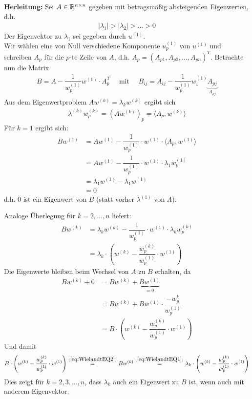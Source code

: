 \textbf{Herleitung:}
Sei $A\in\mathbb R^{n\times n}$ gegeben mit betragsmäßig absteigenden Eigenwerten, d.h. 
%
\begin{align*}
  |\lambda_1| > |\lambda_2| > \dots > 0
\end{align*}
%
Der Eigenvektor zu $\lambda_1$ sei gegeben durch $u^{(1)}$. \\
Wir wählen eine von Null verschiedene Komponente $u^{(1)}_p$ von $u^{(1)}$ und schreiben $A_p$ für die $p$-te Zeile
von $A$, d.h. $A_p=(A_{p1},A_{p2},\dots,A_{pn})^T$. Betrachte nun die Matrix 
%
\begin{align*}
  B 
  = A - \dfrac{1}{w_p^{(1)}} w^{(1)}\cdot A_p^T\quad\text{ mit }\quad B_{ij} = 
  A_{ij}-\dfrac{1}{w^{(1)}_p}w^{(1)}_i\underbrace{A_{pj}}_{A_{pj}}
\end{align*}
%
Aus dem Eigenwertproblem $Aw^{(k)} = \lambda_k w^{(k)}$ ergibt sich
%
\begin{align*}
  \lambda^{(k)}w^{(k)}_p = (Aw^{(k)})_p = \langle A_p, w^{(k)}\rangle
\end{align*}
%
Für $k=1$ ergibt sich:
%
\begin{align*}
  Bw^{(1)} 
  &= Aw^{(1)} - \dfrac{1}{w^{(1)}_p} \cdot w^{(1)}\cdot \langle A_p, w^{(1)}\rangle \\
  &= Aw^{(1)} - \dfrac{1}{w^{(1)}_p} \cdot w^{(1)}\cdot \lambda_1 w^{(1)}_p \\
  &= \lambda_1 w^{(1)} - \lambda_1w^{(1)} \\
  &= 0
\end{align*}
%
d.h. $0$ ist ein Eigenwert von $B$  (statt vorher $\lambda^{(1)}$ von $A$).  

Analoge Überlegung für $k=2,\dots,n$ liefert:
%
\begin{align*}
  Bw^{(k)} 
  &= \lambda_k w^{(k)} - \dfrac{1}{w^{(1)}_p} \cdot w^{(1)}\cdot \lambda_kw^{(k)}_p \\
  &= \lambda_k\cdot\left(w^{(k)} - \dfrac{w^{(k)}_p}{w^{(1)}_p} \cdot w^{(1)}\right) 
  \tag{1}\label{eq:WielandtEQ1}
\end{align*}
%
Die Eigenwerte bleiben beim Wechsel von $A$ zu $B$ erhalten, da 
\begin{align*}
  Bw^{(k)} + 0 
  &= Bw^{(k)} + \underbrace{Bw^{(1)}}_{=0} \\
  &= Bw^{(k)} + Bw^{(1)}\cdot\dfrac{-w_p^{k}}{w_p^{(1)}} \\
  &= B\cdot\left(w^{(k)} - \dfrac{w^{(k)}_p}{w^{(1)}_p} \cdot w^{(1)}\right) 
  \tag{2}\label{eq:WielandtEQ2}
\end{align*}
Und damit 
\begin{align*}
  B\cdot\left(w^{(k)} - \dfrac{w^{(k)}_p}{w^{(1)}_p} \cdot w^{(1)}\right) 
   \stackrel{(\ref{eq:WielandtEQ2})}{=} Bw^{(k)} \stackrel{(\ref{eq:WielandtEQ1})}{=}
  \lambda_k\cdot\left(w^{(k)} - \dfrac{w^{(k)}_p}{w^{(1)}_p} \cdot w^{(1)}\right)
\end{align*}
Dies zeigt für $k=2,3,\dots,n$, dass $\lambda_k$ auch ein Eigenwert zu $B$ ist, 
wenn auch mit anderem Eigenvektor. 

